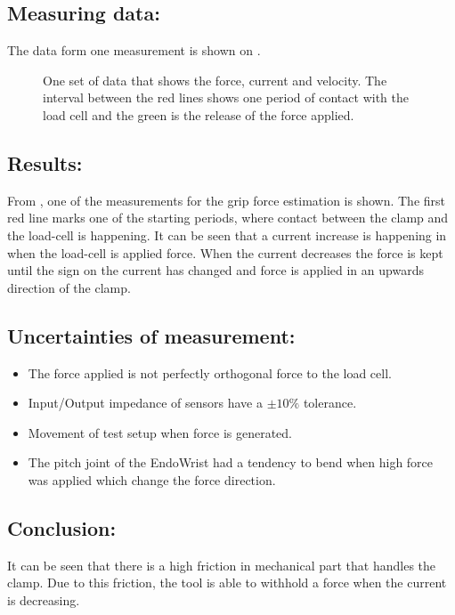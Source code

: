 \subsection*{Measuring data:}
The data form one measurement is shown on .
\begin{figure}[H]
\centering

\caption{One set of data that shows the force, current and velocity. The interval between the red lines shows one period of contact with the load cell and the green is the release of the force applied.}
\label{yaw_mes123}
\end{figure}




\subsection*{Results:}
From , one of the measurements for the grip force estimation is shown. The first red line marks one of the starting periods, where contact between the clamp and the load-cell is happening. It can be seen that a current increase is happening in when the load-cell is applied force. When the current decreases the force is kept until the sign on the current has changed and force is applied in an upwards direction of the clamp. 




%

\subsection*{Uncertainties of measurement:}
\begin{itemize}
\item The force applied is not perfectly orthogonal force to the load cell.
\item Input/Output impedance of sensors have a $\pm 10 \%$ tolerance.
\item Movement of test setup when force is generated.
\item The pitch joint of the EndoWrist had a tendency to bend when high force was applied which change the force direction. 
\end{itemize}

\subsection*{Conclusion:}
It can be seen that there is a high friction in mechanical part that handles the clamp. Due to this friction, the tool is able to withhold a force when the current is decreasing.
